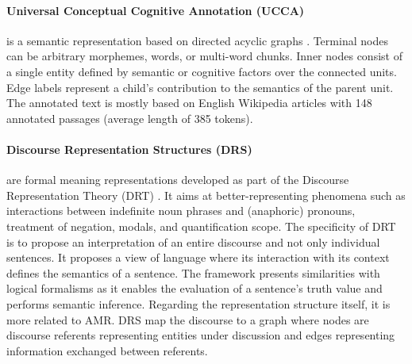 

\paragraph{Universal Conceptual Cognitive Annotation (UCCA)} is a semantic representation based on directed acyclic graphs \parencite{abend2013universal}. Terminal nodes can be arbitrary morphemes, words, or multi-word chunks. Inner nodes consist of a single entity defined by semantic or cognitive factors over the connected units. Edge labels represent a child's contribution to the semantics of the parent unit. The annotated text is mostly based on English Wikipedia articles with 148 annotated passages  (average length of 385 tokens).

\paragraph{Discourse Representation Structures (DRS)} are formal meaning representations developed as part of the Discourse Representation Theory (DRT) \parencite{kamp2013discourse}. It aims at better-representing phenomena such as interactions between indefinite noun phrases and (anaphoric) pronouns, treatment of negation, modals, and quantification scope. The specificity of DRT is to propose an interpretation of an entire discourse and not only individual sentences. It proposes a view of language where its interaction with its context defines the semantics of a sentence. The framework presents similarities with logical formalisms as it enables the evaluation of a sentence's truth value and performs semantic inference. Regarding the representation structure itself, it is more related to AMR. DRS map the discourse to a graph where nodes are discourse referents representing entities under discussion and edges representing information exchanged between referents.

